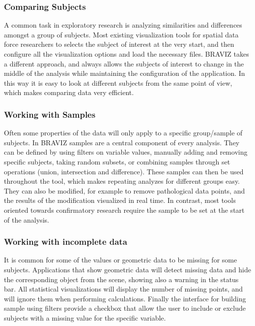 \documentclass[twocolumn]{svjour3}
\begin{document}
\subsubsection{Comparing Subjects}

A common task in exploratory research is analyzing similarities and differences amongst a group of subjects. Most existing visualization tools for spatial data force researchers to selects the subject of interest at the very start, and then configure all the visualization options and load the necessary files. BRAVIZ takes a different approach, and always allows the subjects of interest to change in the middle of the analysis while maintaining the configuration of the application. In this way it is easy to look at different subjects from the same point of view, which makes comparing data very efficient.  

\subsubsection{Working with Samples}

Often some properties of the data will only apply to a specific group/sample of subjects. In BRAVIZ samples are a central component of every analysis. They can be defined by using filters on variable values, manually adding and removing specific subjects, taking random subsets, or combining samples through set operations (union, intersection and difference). These samples can then be used throughout the tool, which makes repeating analyzes for different groups easy. They can also be modified, for example to remove pathological data points, and the results of the modification visualized in real time. In contrast, most tools oriented towards confirmatory research require the sample to be set at the start of the analysis.

\subsubsection{Working with incomplete data}

It is common for some of the values or geometric data to be missing for some subjects. Applications that show geometric data will detect missing data and hide the corresponding object from the scene, showing also a warning in the status bar. All statistical visualizations will display the number of missing points, and will ignore them when performing calculations. Finally the interface for building sample using filters provide a checkbox that allow the user to include or exclude subjects with a missing value for the specific variable.
\end{document}
